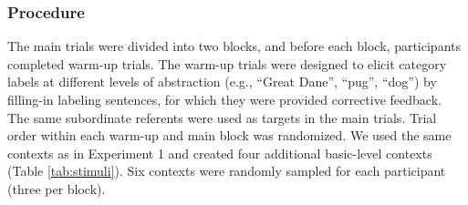 \documentclass[10pt,letterpaper]{article}
\begin{document}
\subsubsection{Procedure}
The main trials were divided into two blocks, and before each block, participants completed warm-up trials. The warm-up trials were designed to elicit category labels at different levels of abstraction (e.g., ``Great Dane'', ``pug'', ``dog'') by filling-in labeling sentences, for which they were provided corrective feedback. %
The same subordinate referents were used as targets in the main trials. 
Trial order within each warm-up and main block was randomized. We used the same contexts as in Experiment 1 and created four additional basic-level contexts (Table \ref{tab:stimuli}). 
Six contexts were randomly sampled for each participant (three per block). 
\end{document}
